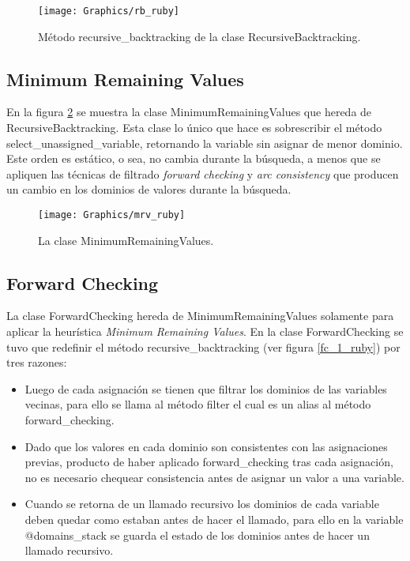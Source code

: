 \begin{figure}
	\begin{center}
		\texttt{[image: Graphics/rb\_ruby]}
		\caption{M\'etodo \textsf{recursive\_backtracking} de la clase \textsf{RecursiveBacktracking}.}
		\label{rb_ruby}
	\end{center}	
\end{figure}

\subsection{Minimum Remaining Values}

En la figura \ref{mrv_ruby} se muestra la clase \textsf{MinimumRemainingValues} que hereda de \textsf{RecursiveBacktracking}. Esta clase lo \'unico que hace es sobrescribir el m\'etodo \textsf{select\_unassigned\_variable}, retornando la variable sin asignar de menor dominio. Este orden es est\'atico, o sea, no cambia durante la b\'usqueda, a menos que se apliquen las t\'ecnicas de filtrado \emph{forward checking} y \emph{arc consistency} que producen un cambio en los dominios de valores durante la b\'usqueda.

\begin{figure}[h]
	\begin{center}
		\texttt{[image: Graphics/mrv\_ruby]}
		\caption{La clase \textsf{MinimumRemainingValues}.}
		\label{mrv_ruby}
	\end{center}	
\end{figure}

\subsection{Forward Checking}

La clase \textsf{ForwardChecking} hereda de \textsf{MinimumRemainingValues} solamente para aplicar la heur\'istica \emph{Minimum Remaining Values}. En la clase \textsf{ForwardChecking} se tuvo que redefinir el m\'etodo \textsf{recursive\_backtracking} (ver figura \ref{fc_1_ruby}) por tres razones:

\begin{itemize}

\item Luego de cada asignaci\'on se tienen que filtrar los dominios de las variables vecinas, para ello se llama al m\'etodo \textsf{filter} el cual es un alias al m\'etodo \textsf{forward\_checking}.
\item Dado que los valores en cada dominio son consistentes con las asignaciones previas, producto de haber aplicado \textsf{forward\_checking} tras cada asignaci\'on, no es necesario chequear consistencia antes de asignar un valor a una variable.
\item Cuando se retorna de un llamado recursivo los dominios de cada variable deben quedar como estaban antes de hacer el llamado, para ello en la variable \textsf{@domains\_stack} se guarda el estado de los dominios antes de hacer un llamado recursivo.

\end{itemize}

